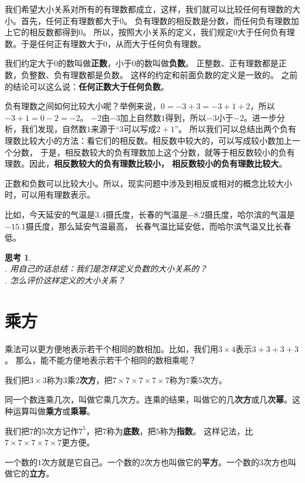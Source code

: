 \documentclass[12pt,UTF8]{ctexbook}
\newtheorem{sk}{思考}[section]
\begin{document}
我们希望大小关系对所有的有理数都成立，这样，我们就可以比较任何有理数的大小。首先，任何正有理数都大于$0$。
负有理数的相反数是分数，而任何负有理数加上它的相反数都得到$0$。
所以，按照大小关系的定义，我们规定$0$大于任何负有理数。于是任何正有理数大于$0$，从而大于任何负有理数。

我们约定大于$0$的数叫做\textbf{正数}，小于$0$的数叫做\textbf{负数}。
正整数、正有理数都是正数，负整数、负有理数都是负数。
这样的约定和前面负数的定义是一致的。
之前的结论可以这么说：\textbf{任何正数大于任何负数}。

负有理数之间如何比较大小呢？举例来说，$0 = -3 + 3 = -3 + 1 + 2$，所以$-3 + 1 = 0 - 2 = -2$。
$-2$由$-3$加上自然数$1$得到，所以$-3$小于$-2$。进一步分析，我们发现，自然数$1$来源于“$3$可以写成$2+1$”。
所以我们可以总结出两个负有理数比较大小的方法：看它们的相反数。相反数中较大的，可以写成较小数加上一个分数，
于是，相反数较大的负有理数加上这个分数，就等于相反数较小的负有理数。因此，\textbf{相反数较大的负有理数比较小，
相反数较小的负有理数比较大}。

正数和负数可以比较大小。所以，现实问题中涉及到相反或相对的概念比较大小时，可以用有理数表示。

比如，今天延安的气温是$3.4$摄氏度，长春的气温是$-8.2$摄氏度，哈尔滨的气温是$-15.1$摄氏度，那么延安气温最高，
长春气温比延安低，而哈尔滨气温又比长春低。

\begin{sk}\label{sk:0-1-0}
    \mbox{}\\
    . 用自己的话总结：我们是怎样定义负数的大小关系的？\\
    . 怎么评价这样定义的大小关系？
\end{sk}

\section{乘方}
乘法可以更方便地表示若干个相同的数相加。比如，我们用$3 \times 4$表示$3+3+3+3$。
那么，能不能方便地表示若干个相同的数相乘呢？

我们把$3\times 3$称为$3$乘$2$\textbf{次方}，把$7\times 7\times 7\times 7\times 7$称为$7$乘$5$次方。

同一个数连乘几次，叫做它乘几次方。连乘的结果，叫做它的几\textbf{次方}或几\textbf{次幂}。这种运算叫做\textbf{乘方}或\textbf{乘幂}。

我们把$7$的$5$次方记作$7^5$，把$7$称为\textbf{底数}，把$5$称为\textbf{指数}。
这样记法，比$7\times 7\times 7\times 7\times 7$更方便。

一个数的$1$次方就是它自己。一个数的$2$次方也叫做它的\textbf{平方}。一个数的$3$次方也叫做它的\textbf{立方}。
\end{document}
